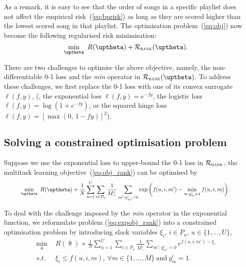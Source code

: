 As a remark, it is easy to see that the order of songs in a specific playlist does not affect the empirical 
risk~(\ref{eq:bprisk}) as long as they are scored higher than the lowest scored song in that playlist.
The optimisation problem~(\ref{eq:obj}) now become the following regularised risk minimisation:
\begin{equation}
\label{eq:obj_rank}
\min_\uptheta \ R(\uptheta) + \RCal_\textsc{rank}(\uptheta).
\end{equation}

There are two challenges to optimise the above objective,
namely, the non-differentiable 0-1 loss and the \emph{min} operator in $\RCal_\textsc{rank}(\uptheta)$.
To address these challenges, we first replace the 0-1 loss with one of its convex surrogate $\ell(f, y)$,
(\eg, the exponential loss $\ell(f, y) = e^{-fy}$, the logistic loss $\ell(f, y) = \log(1 + e^{-fy})$,
or the squared hinge loss $\ell(f, y) = [\max(0, \, 1 - fy)]^2$).



\subsection{Solving a constrained optimisation problem}

Suppose we use the exponential loss to upper-bound the 0-1 loss in $\mathcal{R}_\textsc{rank}$,
the multitask learning objective~(\ref{eq:obj_rank}) can be optimised by
\begin{equation}
\label{eq:expobj_rank}
\resizebox{.9\linewidth}{!}{$\displaystyle
\min_{\uptheta} \ R(\uptheta) + \frac{1}{N} \sum_{u=1}^U \sum_{i \in P_u} \frac{1}{M_-^i} 
                  \sum_{m': y_{m'}^i = 0} \exp \left(f(u, i, m') - \min_{m: y_m^i = 1} f(u, i, m) \right).
$}
\end{equation}

To deal with the challenge imposed by the \emph{min} operator in the exponential function, 
we reformulate problem (\ref{eq:expobj_rank}) into a constrained optimisation problem by 
introducing slack variables $\xi_i, \, i \in P_u, \, u \in \{1,\dots,U\}$,
\begin{equation}
\label{eq:expobj_cons}
\begin{aligned}
\min_{\uptheta} \ \, & R(\uptheta) + \frac{1}{N} \sum_{u=1}^U \sum_{i \in P_u} \frac{1}{M_-^i} \sum_{m': y_{m'}^i = 0} e^{f(u, i, m') - \xi_i} \\
s.t. \ \, & \xi_i \le f(u, i, m), \ \forall m \in \{1,\dots,M\} \ \text{and} \ y_m^i = 1.
\end{aligned}
\end{equation}

